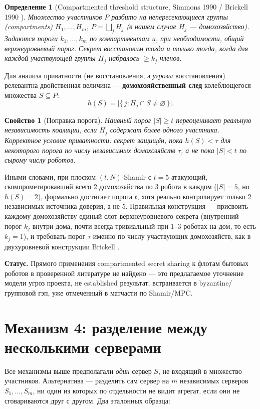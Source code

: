\documentclass[11pt]{article}
\newtheorem{definition}{Определение}
\newtheorem{property}{Свойство}
\begin{document}
\begin{definition}[Compartmented threshold structure, Simmons 1990 / Brickell 1990
  \cite{compartmented1990}]
Множество участников $P$ разбито на непересекающиеся группы (compartments)
$H_1,\dots,H_m$, $P = \bigsqcup_j H_j$ (в нашем случае $H_j$ — домохозяйство).
Задаются пороги $k_1,\dots,k_m$ по компартментам и, при необходимости, общий
верхнеуровневый порог. Секрет восстановим тогда и только тогда, когда для каждой
участвующей группы $H_j$ набралось $\ge k_j$ членов.
\end{definition}

Для анализа приватности (не восстановления, а \emph{угрозы} восстановления)
релевантна двойственная величина — \textbf{домохозяйственный след} колеблющегося
множества $S\subseteq P$:
\[
  h(S) = \bigl|\{\, j : H_j \cap S \ne \varnothing \,\}\bigr|.
\]

\begin{property}[Поправка порога]
Наивный порог $|S|\ge t$ переоценивает реальную независимость коалиции, если
$H_j$ содержат более одного участника. Корректное условие приватности: секрет
защищён, пока $h(S) < \tau$ для некоторого порога по числу \emph{независимых}
домохозяйств $\tau$, а не пока $|S| < t$ по сырому числу роботов.
\end{property}

Иными словами, при плоском $(t,N)$-Shamir с $t=5$ атакующий, скомпрометировавший
всего 2 домохозяйства по 3 робота в каждом ($|S|=5$, но $h(S)=2$), формально
достигает порога $t$, хотя реально контролирует только 2 независимых источника
доверия, а не 5. Правильная конструкция — присвоить каждому домохозяйству единый
слот верхнеуровневого секрета (внутренний порог $k_j$ внутри дома, почти всегда
тривиальный при 1--3 роботах на дом, то есть $k_j=1$), и требовать порог $\tau$
именно по числу участвующих домохозяйств, как в двухуровневой конструкции
Brickell \cite{compartmented1990}.

\textbf{Статус.} Прямого применения compartmented secret sharing к флотам бытовых
роботов в проверенной литературе не найдено — это предлагаемое уточнение модели
угроз проекта, не established результат; встраивается в byzantine/групповой гэп,
уже отмеченный в матчасти по Shamir/MPC.

\section{Механизм 4: разделение между несколькими серверами}

Все механизмы выше предполагали \emph{один} сервер $S$, не входящий в множество
участников. Альтернатива — разделить сам сервер на $m$ независимых серверов
$S_1,\dots,S_m$, ни один из которых по отдельности не видит агрегат, если они не
сговариваются друг с другом. Два эталонных образца:
\end{document}
